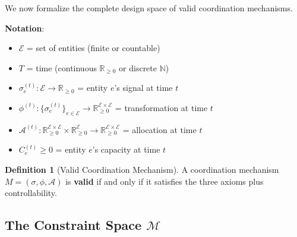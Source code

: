 \documentclass[11pt,a4paper]{article}
\theoremstyle{definition}
\newtheorem{definition}[theorem]{Definition}
\theoremstyle{remark}
\newcommand{\E}{\mathcal{E}}
\newcommand{\A}{\mathcal{A}}
\begin{document}
We now formalize the complete design space of valid coordination mechanisms.

\textbf{Notation}:
\begin{itemize}
\item $\E$ = set of entities (finite or countable)
\item $T$ = time (continuous $\mathbb{R}_{\ge 0}$ or discrete $\mathbb{N}$)
\item $\sigma_e^{(t)}: \E \to \mathbb{R}_{\ge 0}$ = entity $e$'s signal at time $t$
\item $\phi^{(t)}: \{\sigma_e^{(t)}\}_{e\in\E} \to \mathbb{R}_{\ge 0}^{\E\times\E}$ = transformation at time $t$
\item $\A^{(t)}: \mathbb{R}_{\ge 0}^{\E\times\E} \times \mathbb{R}_{\ge 0}^{\E} \to \mathbb{R}_{\ge 0}^{\E\times\E}$ = allocation at time $t$
\item $C_e^{(t)} \ge 0$ = entity $e$'s capacity at time $t$
\end{itemize}

\begin{definition}[Valid Coordination Mechanism]
\label{def:valid-mechanism}
A coordination mechanism $M = (\sigma, \phi, \A)$ is \textbf{valid} if and only if it satisfies the three axioms plus controllability.
\end{definition}

\subsection{The Constraint Space $\mathcal{M}$}
\end{document}
